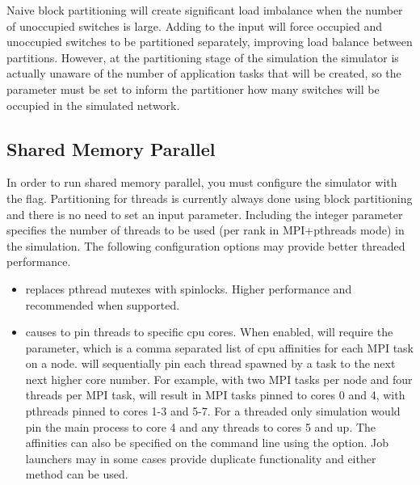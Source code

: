 Naive block partitioning will create significant load imbalance when the number of unoccupied switches is large.
Adding  to the input will force occupied and unoccupied switches to be partitioned separately, improving load balance between partitions.
However, at the partitioning stage of the simulation the simulator is actually unaware of the number of application tasks that will be created, so the  parameter must be set to inform the partitioner how many switches will be occupied in the simulated network.



\subsection{Shared Memory Parallel}
\label{subsec:parallelopt}
In order to run shared memory parallel, you must configure the simulator with the  flag.
Partitioning for threads is currently always done using block partitioning and there is no need to set an input parameter.
Including the integer parameter  specifies the number of threads to be used (per rank in MPI+pthreads mode) in the simulation.
The following configuration options may provide better threaded performance.
\begin{itemize}
\item{} replaces pthread mutexes with spinlocks.  Higher performance and recommended when supported.
\item{} causes \sstmacro to pin threads to specific cpu cores.  When enabled, \sstmacro will require the
 parameter, which is a comma separated list of cpu affinities for each MPI task on a node.  \sstmacro will sequentially
pin each thread spawned by a task to the next next higher core number.  For example, with two MPI tasks per node and four threads per MPI task,
 will result in MPI tasks pinned to cores 0 and 4, with pthreads pinned to cores 1-3 and 5-7.
For a threaded only simulation  would pin the main process to core 4 and any threads to cores 5 and up.
The affinities can also be specified on the command line using the  option.
Job launchers may in some cases provide duplicate functionality and either method can be used.
\end{itemize}

